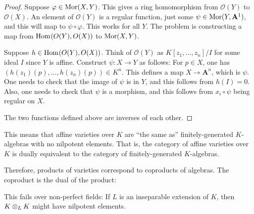 \documentclass [11 pt, oneside] {article}
\begin{document}
\begin{proof}
Suppose $\varphi \in \operatorname{Mor}(X,Y)$. This gives a ring homomorphism from $\mathscr{O}(Y) $ to $\mathscr{O}(X)$. An element of $\mathscr{O}(Y)$ is a regular function, just some $\psi\in \operatorname{Mor}(Y, \mathbf{A}^1)$, and this will map to $\psi\circ\varphi$. This works for all $Y$. The problem is constructing a map from $\operatorname{Hom}_{}(\relax{O}(Y), \relax{O}(X))$ to $\operatorname{Mor}(X,Y)$. 

Suppose $h\in \operatorname{Hom}_{}(\relax{O}(Y),\relax{O}(X) )$. Think of $\mathscr{O}(Y)$ as $K[z_1,\hdots, z_n]/I$ for some ideal $I$ since $Y$ is affine. Construct $\psi:X\longrightarrow Y$ as follows: For $p\in X$, one has $(h(z_1)(p),\hdots, h(z_n) (p))\in K^n$. This defines a map $X\longrightarrow \mathbf{A}^n$, which is $\psi$. One needs to check that the image of $\psi$ is in $Y$, and this follows from $h(I)=0$. Also, one needs to check that $\psi$ is a morphism, and this follows from $x_i\circ\psi$ being regular on $X$.

The two functions defined above are inverses of each other.
\end{proof}
\begin{remark}
This means that affine varieties over $K$ are ``the same as'' finitely-generated $K$-algebras with no nilpotent elements. That is, the category of affine varieties over $K$ is dually equivalent to the category of finitely-generated $K$-algebras.

Therefore, products of varieties correspond to coproducts of algebras. The coproduct is the dual of the product:
\begin{center}
\end{center}
\end{remark}
\begin{warn}
	This fails over non-perfect fields: If $L$ is an inseparable extension of $K$, then $K\otimes_L K$ might have nilpotent elements. 
\end{warn}
\end{document}
